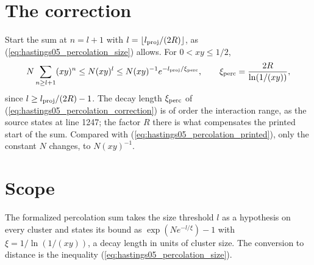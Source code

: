 \documentclass{article}
\begin{document}
\section{The correction}
Start the sum at $n=l+1$ with $l=\lfloor l_{\rm proj}/(2R)\rfloor$, as
(\ref{eq:hastings05_percolation_size}) allows. For $0<xy\le1/2$,
\begin{align}
 N\sum_{n\ge l+1}(xy)^n\le N(xy)^l
 \le N(xy)^{-1}e^{-l_{\rm proj}/\xi_{\rm perc}},
 \qquad
 \xi_{\rm perc}=\frac{2R}{\ln(1/(xy))},
 \label{eq:hastings05_percolation_correction}
\end{align}
since $l\ge l_{\rm proj}/(2R)-1$. The decay length $\xi_{\rm perc}$ of
(\ref{eq:hastings05_percolation_correction}) is of order the interaction
range, as the source states at line 1247; the factor $R$ there is what
compensates the printed start of the sum. Compared with
(\ref{eq:hastings05_percolation_printed}), only the constant $N$ changes, to
$N(xy)^{-1}$.

\section{Scope}
The formalized percolation sum takes the size threshold $l$ as a hypothesis
on every cluster and states its bound as $\exp(Ne^{-l/\xi})-1$ with
$\xi=1/\ln(1/(xy))$, a decay length in units of cluster size. The
conversion to distance is the inequality
(\ref{eq:hastings05_percolation_size}).


\end{document}
